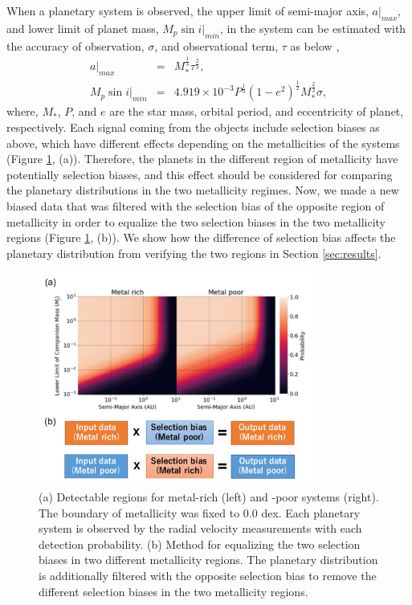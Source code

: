 \documentclass[twocolumn, dvipdfmx]{aastex62}
\begin{document}
\begin{CJK*}{UTF8}{min}
When a planetary system is observed, the upper limit of semi-major axis, $a|_{max}$, and lower limit of planet mass, $M_p\sin i|_{min}$, in the system can be estimated with the accuracy of observation, $\sigma$, and observational term, $\tau$ as below \citep{2008ApJ...677.1324T},
\begin{eqnarray}
a|_{max} &=& M_{*}^{\frac{1}{3}}\tau^{\frac{2}{3}} , \\
M_p\sin i|_{min} &=& 4.919\times10^{-3}P^{\frac{1}{3}}(1-e^2)^{\frac{1}{2}}M_{*}^{\frac{2}{3}}\sigma ,
\end{eqnarray}
where, $M_*$, $P$, and $e$ are the star mass, orbital period, and eccentricity of planet, respectively. Each signal coming from the objects include selection biases as above, which have different effects depending on the metallicities of the systems (Figure \ref{fig:bias}, (a)). Therefore, the planets in the different region of metallicity have potentially selection biases, and this effect should be considered for comparing the planetary distributions in the two metallicity regimes. Now, we made a new biased data that was filtered with the selection bias of the opposite region of metallicity in order to equalize the two selection biases in the two metallicity regions (Figure \ref{fig:bias}, (b)). We show how the difference of selection bias affects the planetary distribution from verifying the two regions in Section \ref{sec:results}.


\begin{figure}[t]
\begin{center}
\includegraphics[width=9cm]{../../../Figure/selection_bias.pdf}
\caption{(a) Detectable regions for metal-rich (left) and -poor systems (right). The boundary of metallicity was fixed to 0.0 dex. Each planetary system is observed by the radial velocity measurements with each detection probability. (b) Method for equalizing the two selection biases in two different metallicity regions. The planetary distribution is additionally filtered with the opposite selection bias to remove the different selection biases in the two metallicity regions. \label{fig:bias}}
\end{center}
\end{figure}


\end{CJK*}
\end{document}

